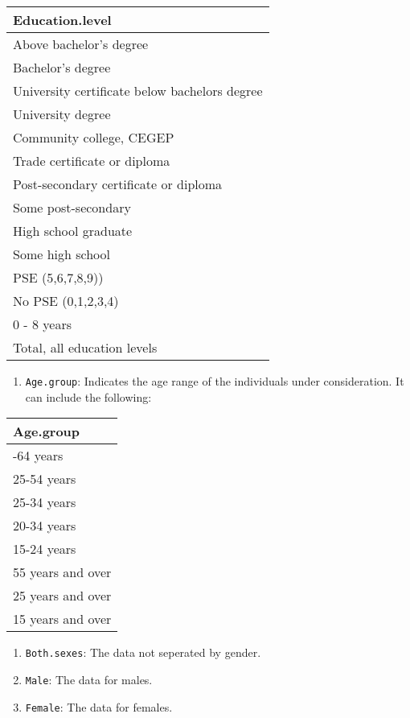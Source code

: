\documentclass[
]{article}
\providecommand{\tightlist}{%
  \setlength{\itemsep}{0pt}\setlength{\parskip}{0pt}}
\begin{document}
\begin{longtable}[]{@{}l@{}}
\toprule\noalign{}
Education.level \\
\midrule\noalign{}
\endhead
\bottomrule\noalign{}
\endlastfoot
Above bachelor's degree \\
Bachelor's degree \\
University certificate below bachelors degree \\
University degree \\
Community college, CEGEP \\
Trade certificate or diploma \\
Post-secondary certificate or diploma \\
Some post-secondary \\
High school graduate \\
Some high school \\
PSE (5,6,7,8,9)) \\
No PSE (0,1,2,3,4) \\
0 - 8 years \\
Total, all education levels \\
\end{longtable}

\begin{enumerate}
\def\labelenumi{\arabic{enumi}.}
\setcounter{enumi}{5}
\tightlist
\item
  \texttt{Age.group}: Indicates the age range of the individuals under
  consideration. It can include the following:
\end{enumerate}

\begin{longtable}[]{@{}l@{}}
\toprule\noalign{}
Age.group \\
\midrule\noalign{}
\endhead
\bottomrule\noalign{}
\endlastfoot
25-64 years \\
25-54 years \\
25-34 years \\
20-34 years \\
15-24 years \\
55 years and over \\
25 years and over \\
15 years and over \\
\end{longtable}

\begin{enumerate}
\def\labelenumi{\arabic{enumi}.}
\setcounter{enumi}{6}
\tightlist
\item
  \texttt{Both.sexes}: The data not seperated by gender.
\item
  \texttt{Male}: The data for males.
\item
  \texttt{Female}: The data for females.
\end{enumerate}
\end{document}

